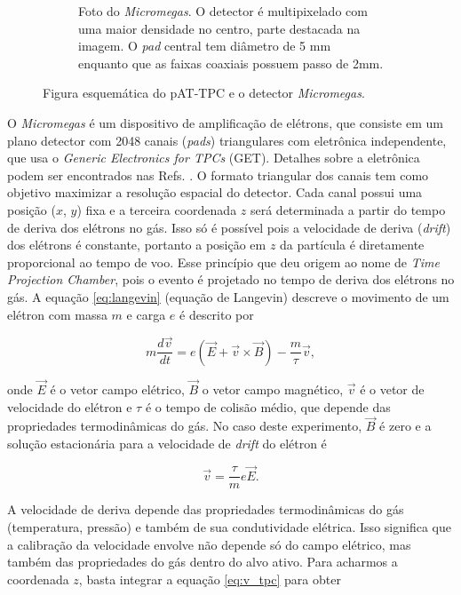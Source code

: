 \documentclass[a4paper,12pt,oneside]{book}
\begin{document}
\begin{figure}[H]
\begin{subfigure}[t]{0.49\textwidth}
        \caption{Foto do \textit{Micromegas}. O detector é multipixelado com uma maior densidade no centro, parte destacada na imagem. O \textit{pad} central tem diâmetro de 5 mm enquanto que as faixas coaxiais possuem passo de 2mm\cite{attpc, josh_bradt}.}
        \label{subfig:micromegas} 
    \end{subfigure}
\caption{Figura esquemática do pAT-TPC e o detector \textit{Micromegas}\cite{pattpc}.}
\label{fig:pattpc_e_micromegas}
\end{figure}

\par O \textit{Micromegas} é um dispositivo de amplificação de elétrons, que consiste em um plano detector com 2048 canais (\textit{pads}) triangulares com eletrônica independente, que usa o \textit{Generic Electronics for TPCs} (GET)\cite{GET}. Detalhes sobre a eletrônica podem ser encontrados nas Refs. \cite{GET, josh_bradt}. O formato triangular dos canais tem como objetivo maximizar a resolução espacial do detector\cite{attpc}. Cada canal possui uma posição ($x$, $y$) fixa e a terceira coordenada $z$ será determinada a partir do tempo de deriva dos elétrons no gás\cite{pattpc, pattpc2, attpc, josh_bradt}. Isso só é possível pois a velocidade de deriva (\textit{drift}) dos elétrons é constante\cite{drift_constant}, portanto a posição em $z$ da partícula é diretamente proporcional ao tempo de voo. Esse princípio que deu origem ao nome de \textit{Time Projection Chamber}, pois o evento é projetado no tempo de deriva dos elétrons no gás. A equação  \ref{eq:langevin} (equação de Langevin) descreve o movimento de um elétron com massa $m$ e carga $e$ é descrito por\cite{drift_constant}

\begin{equation}\label{eq:langevin}
    m\frac{d\vec{v}}{dt} = e\left(\vec{E} +\vec{v}\times \vec{B}\right) - \frac{m}{\tau}\vec{v},
\end{equation}

onde $\vec{E}$ é o vetor campo elétrico, $\vec{B}$ o vetor campo magnético, $\vec{v}$ é o vetor de velocidade do elétron e $\tau$ é o tempo de colisão médio, que depende das propriedades termodinâmicas do gás. No caso deste experimento, $\vec{B}$ é zero e a solução estacionária para a velocidade de \textit{drift} do elétron é

\begin{equation}\label{eq:v_tpc}
    \vec{v} = \frac{\tau}{m}e\vec{E}.
\end{equation}

\par A velocidade de deriva depende das propriedades termodinâmicas do gás (temperatura, pressão) e também de sua condutividade elétrica\cite{drift_constant}. Isso significa que a calibração da velocidade envolve não depende só do campo elétrico, mas também das propriedades do gás dentro do alvo ativo\cite{pattpc, drift_constant}. Para acharmos a coordenada $z$, basta integrar a equação \ref{eq:v_tpc} para obter
\end{document}
